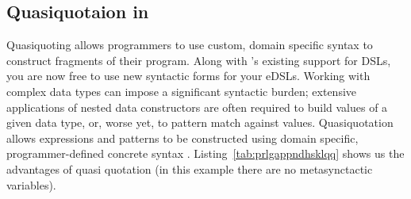 \documentclass[thesis-solanki.tex]{subfiles}
\begin{document}
\subsection{Quasiquotaion in }

Quasiquoting allows programmers to use custom, domain specific syntax to construct fragments of their program.
Along with 's existing support for DSLs, you are now free to use new
syntactic forms for your eDSLs.
Working with complex data types can impose a significant syntactic burden; extensive applications of nested data
constructors are often required to build values of a given data type, or, worse yet, to pattern match against
values.
Quasiquotation allows  expressions and patterns to be constructed using domain specific, programmer-defined
concrete syntax \cite{haskellquasi, mainland2007s}.
Listing~\ref{tab:prlgappndhsklqq} shows us the advantages of quasi quotation (in this example there are no
metasynctactic variables).


\ifMain\ifDraft
\begin{scope}
  \nolinenumbers
  \enotesize
  \par
  \begin{singlespace}
  \setlength{\parskip}{12pt plus 2pt minus 1pt}
  \theendnotes
  \par
  \end{singlespace}
\end{scope}
\fi\fi
\end{document}
